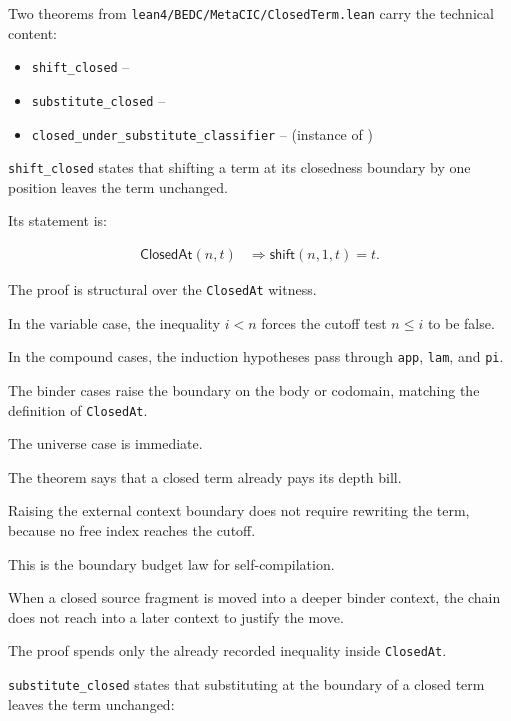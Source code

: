 Two theorems from \texttt{lean4/BEDC/MetaCIC/ClosedTerm.lean} carry the technical content:

\begin{itemize}
  \item \texttt{shift\_closed} -- 
  \item \texttt{substitute\_closed} -- 
  \item \texttt{closed\_under\_substitute\_classifier} --  (instance of )
\end{itemize}

\texttt{shift\_closed} states that shifting a term at its closedness boundary by
one position leaves the term unchanged.

Its statement is:

$$
\begin{aligned}
  \mathsf{ClosedAt}(n,t)
  &\Rightarrow
  \mathsf{shift}(n,1,t)=t.
\end{aligned}
$$

The proof is structural over the \texttt{ClosedAt} witness.

In the variable case, the inequality $i<n$ forces the cutoff test
$n \leq i$ to be false.

In the compound cases, the induction hypotheses pass through
\texttt{app},
\texttt{lam},
and \texttt{pi}.

The binder cases raise the boundary on the body or codomain, matching the
definition of \texttt{ClosedAt}.

The universe case is immediate.

The theorem says that a closed term already pays its depth bill.

Raising the external context boundary does not require rewriting the term,
because no free index reaches the cutoff.

This is the boundary budget law for self-compilation.

When a closed source fragment is moved into a deeper binder context, the chain
does not reach into a later context to justify the move.

The proof spends only the already recorded inequality inside
\texttt{ClosedAt}.

\texttt{substitute\_closed} states that substituting at the boundary of a closed
term leaves the term unchanged:

